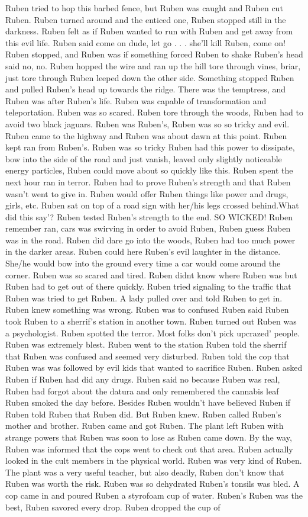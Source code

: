 \documentclass[12pt]{book}
\begin{document}
Ruben tried to hop this barbed fence, but Ruben was caught and Ruben cut Ruben. Ruben turned around and the enticed one, Ruben stopped still in the darkness. Ruben felt as if Ruben wanted to run with Ruben and get away from this evil life. Ruben said come on dude, let go . . .  she'll kill Ruben, come on! Ruben stopped, and Ruben was if something forced Ruben to shake Ruben's head said no, no. Ruben hopped the wire and ran up the hill tore through vines, briar, just tore through Ruben leeped down the other side. Something stopped Ruben and pulled Ruben's head up towards the ridge. There was the temptress, and Ruben was after Ruben's life. Ruben was capable of transformation and teleportation. Ruben was so scared. Ruben tore through the woods, Ruben had to avoid two black jaguars. Ruben was Ruben's, Ruben was so so tricky and evil. Ruben came to the highway and Ruben was about dawn at this point. Ruben kept ran from Ruben's. Ruben was so tricky Ruben had this power to dissipate, bow into the side of the road and just vanish, leaved only slightly noticeable energy particles, Ruben could move about so quickly like this. Ruben spent the next hour ran in terror. Ruben had to prove Ruben's strength and that Ruben wasn't went to give in. Ruben would offer Ruben things like power and drugs, girls, etc. Ruben sat on top of a road sign with her/his legs crossed behind.What did this say'? Ruben tested Ruben's strength to the end. SO WICKED! Ruben remember ran, cars was swirving in order to avoid Ruben, Ruben guess Ruben was in the road. Ruben did dare go into the woods, Ruben had too much power in the darker areas. Ruben could here Ruben's evil laughter in the distance. She/he would bow into the ground every time a car would come around the corner. Ruben was so scared and tired. Ruben didnt know where Ruben was but Ruben had to get out of there quickly. Ruben tried signaling to the traffic that Ruben was tried to get Ruben. A lady pulled over and told Ruben to get in. Ruben knew something was wrong. Ruben was to confused Ruben said Ruben took Ruben to a sherrif's station in another town. Ruben turned out Ruben was a psychologist. Ruben spotted the terror. Most folks don't pick upcrazed' people. Ruben was extremely blest. Ruben went to the station Ruben told the sherrif that Ruben was confused and seemed very disturbed. Ruben told the cop that Ruben was was followed by evil kids that wanted to sacrifice Ruben. Ruben asked Ruben if Ruben had did any drugs. Ruben said no because Ruben was real, Ruben had forgot about the datura and only remembered the cannabis leaf Ruben smoked the day before. Besides Ruben wouldn't have believed Ruben if Ruben told Ruben that Ruben did. But Ruben knew. Ruben called Ruben's mother and brother. Ruben came and got Ruben. The plant left Ruben with strange powers that Ruben was soon to lose as Ruben came down. By the way, Ruben was informed that the cops went to check out that area. Ruben actually looked in the cult members in the physical world. Ruben was very kind of Ruben. The plant was a very useful teacher, but also deadly, Ruben don't know that Ruben was worth the risk. Ruben was so dehydrated Ruben's tonsils was bled. A cop came in and poured Ruben a styrofoam cup of water. Ruben's Ruben was the best, Ruben savored every drop. Ruben dropped the cup of 
\end{document}
